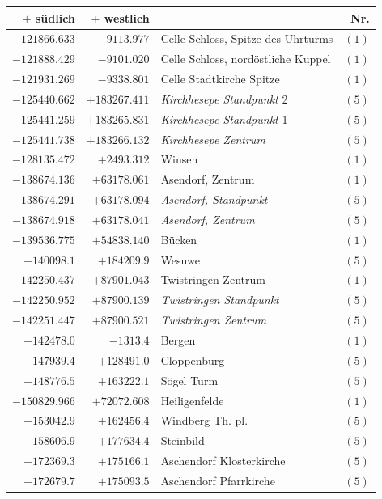 \clearpage{}%
\begin{center}\begingroup\fontsize{8}{9}\selectfont
\setlength{\tabcolsep}{4pt}
\begin{tabular}{r|r|p{170pt}|r}\hline
\(+\) südlich&\(+\) westlich&&Nr.\\\hline
\(-121866.633\)&\(-9113.977\)&Celle Schloss, Spitze des Uhrturms&\((1)\)\\
\(-121888.429\)&\(-9101.020\)&Celle Schloss, nordöstliche Kuppel&\((1)\)\\
\(-121931.269\)&\(-9338.801\)&Celle Stadtkirche Spitze&\((1)\)\\
\(-125440.662\)&\(+183267.411\)&\textit{Kirchhesepe Standpunkt} 2&\((5)\)\\
\(-125441.259\)&\(+183265.831\)&\textit{Kirchhesepe Standpunkt} 1&\((5)\)\\
\(-125441.738\)&\(+183266.132\)&\textit{Kirchhesepe Zentrum}&\((5)\)\\
\(-128135.472\)&\(+2493.312\)&Winsen&\((1)\)\\
\(-138674.136\)&\(+63178.061\)&Asendorf, Zentrum&\((1)\)\\
\(-138674.291\)&\(+63178.094\)&\textit{Asendorf, Standpunkt}&\((5)\)\\
\(-138674.918\)&\(+63178.041\)&\textit{Asendorf, Zentrum}&\((5)\)\\
\(-139536.775\)&\(+54838.140\)&Bücken&\((1)\)\\
\(-140098.1\)&\(+184209.9\)&Wesuwe&\((5)\)\\
\(-142250.437\)&\(+87901.043\)&Twistringen Zentrum&\((1)\)\\
\(-142250.952\)&\(+87900.139\)&\textit{Twistringen Standpunkt}&\((5)\)\\
\(-142251.447\)&\(+87900.521\)&\textit{Twistringen Zentrum}&\((5)\)\\
\(-142478.0\)&\(-1313.4\)&Bergen&\((1)\)\\
\(-147939.4\)&\(+128491.0\)&Cloppenburg&\((5)\)\\
\(-148776.5\)&\(+163222.1\)&Sögel Turm&\((5)\)\\
\(-150829.966\)&\(+72072.608\)&Heiligenfelde&\((1)\)\\
\(-153042.9\)&\(+162456.4\)&Windberg Th. pl.&\((5)\)\\
\(-158606.9\)&\(+177634.4\)&Steinbild&\((5)\)\\
\(-172369.3\)&\(+175166.1\)&Aschendorf Klosterkirche&\((5)\)\\
\(-172679.7\)&\(+175093.5\)&Aschendorf Pfarrkirche&\((5)\)\\

\end{tabular}
\end{center}
